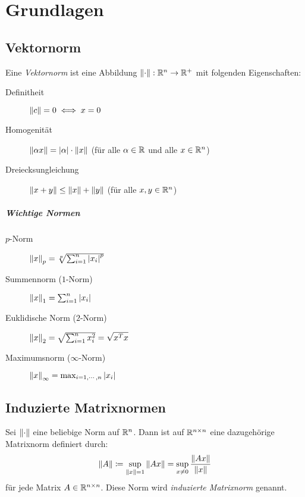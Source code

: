 \chapter{Grundlagen}
	\section{Vektornorm}
		Eine \textit{Vektornorm} ist eine Abbildung \( \norm{\cdot} : \mathbb{R}^n \rightarrow \mathbb{R} ^ + \) mit folgenden Eigenschaften:
		\begin{description}
			\item[Definitheit] \( \norm{c} = 0 \iff x = 0 \)
			\item[Homogenität] \( \norm{\alpha x} = \abs{\alpha} \cdot \norm{x} \) (für alle \( \alpha \in \mathbb{R} \) und alle \( x \in \mathbb{R}^n \))
			\item[Dreiecksungleichung] \( \norm{x + y} \leq \norm{x} + \norm{y} \) (für alle \( x, y \in \mathbb{R}^n \))
		\end{description}

		\paragraph{Wichtige Normen}
			\begin{description}
				\item[\(p\)-Norm] \( \norm{x}_p = \sqrt[p]{\sum_{i = 1}^n \abs{x_i}^p} \)
				\item[Summennorm (\(1\)-Norm)] \( \norm{x}_1 = \sum_{i = 1}^n \abs{x_i} \)
				\item[Euklidische Norm (\(2\)-Norm)] \( \norm{x}_2 = \sqrt{\sum_{i = 1}^n x_i^2} = \sqrt{x^T x} \)
				\item[Maximumsnorm (\(\infty\)-Norm)] \( \norm{x}_\infty = \max_{i = 1, \cdots, n} \abs{x_i} \)
			\end{description}

	\section{Induzierte Matrixnormen}
		Sei \( \norm{\cdot} \) eine beliebige Norm auf \(\mathbb{R}^n\). Dann ist auf \( \mathbb{R}^{n \times n} \) eine dazugehörige Matrixnorm definiert durch:
		\begin{equation*}
			\norm{A} \coloneqq \sup _ {\norm{x} = 1} \norm{Ax} = \sup _ {x\neq 0} \frac{\norm{Ax}}{\norm{x}}
		\end{equation*}
		für jede Matrix \( A \in \mathbb{R}^{n \times n} \). Diese Norm wird \textit{induzierte Matrixnorm} genannt.

